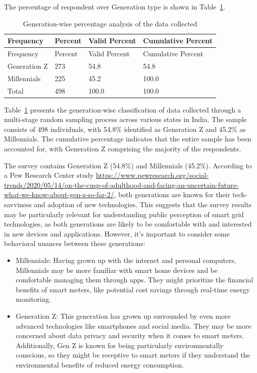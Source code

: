 \documentclass[
  letterpaper,
  DIV=11,
  numbers=noendperiod]{scrartcl}
\begin{document}
The percentage of respondent over Generation type is shown in
Table~\ref{tbl-generation}.

\begin{longtable}[]{@{}llll@{}}
\caption{Generation-wise percentage analysis of the data
collected}\label{tbl-generation}\tabularnewline
\toprule\noalign{}
Frequency & Percent & Valid Percent & Cumulative Percent \\
\midrule\noalign{}
\endfirsthead
\toprule\noalign{}
Frequency & Percent & Valid Percent & Cumulative Percent \\
\midrule\noalign{}
\endhead
\bottomrule\noalign{}
\endlastfoot
Generation Z & 273 & 54.8 & 54.8 \\
Millennials & 225 & 45.2 & 100.0 \\
Total & 498 & 100.0 & 100.0 \\
\end{longtable}

Table~\ref{tbl-generation} presents the generation-wise classification
of data collected through a multi-stage random sampling process across
various states in India. The sample consists of 498 individuals, with
54.8\% identified as Generation Z and 45.2\% as Millennials. The
cumulative percentage indicates that the entire sample has been
accounted for, with Generation Z comprising the majority of the
respondents.

The survey contains Generation Z (54.8\%) and Millennials (45.2\%).
According to a Pew Research Center study
\url{https://www.pewresearch.org/social-trends/2020/05/14/on-the-cusp-of-adulthood-and-facing-an-uncertain-future-what-we-know-about-gen-z-so-far-2/},
both generations are known for their tech-savviness and adoption of new
technologies. This suggests that the survey results may be particularly
relevant for understanding public perception of smart grid technologies,
as both generations are likely to be comfortable with and interested in
new devices and applications. However, it's important to consider some
behavioral nuances between these generations:

\begin{itemize}
\item
  Millennials: Having grown up with the internet and personal computers,
  Millennials may be more familiar with smart home devices and be
  comfortable managing them through apps. They might prioritize the
  financial benefits of smart meters, like potential cost savings
  through real-time energy monitoring.
\item
  Generation Z: This generation has grown up surrounded by even more
  advanced technologies like smartphones and social media. They may be
  more concerned about data privacy and security when it comes to smart
  meters. Additionally, Gen Z is known for being particularly
  environmentally conscious, so they might be receptive to smart meters
  if they understand the environmental benefits of reduced energy
  consumption.
\end{itemize}
\end{document}

